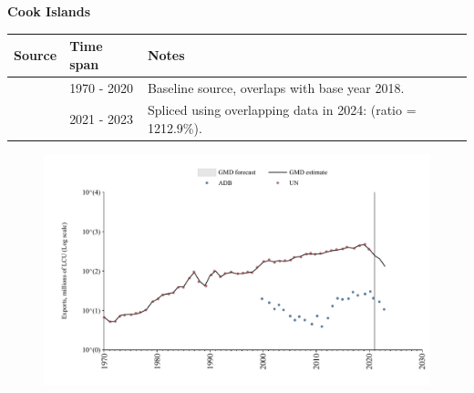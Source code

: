 \documentclass[12pt,a4paper,landscape]{article}
\begin{document}
\begin{adjustbox}{max totalsize={\paperwidth}{\paperheight},center}
\begin{minipage}[t][\textheight][t]{\textwidth}
\vspace*{0.5cm}
{}
\begin{center}
{\Large\bfseries Cook Islands}
\end{center}
\vspace{0.5cm}
\begin{table}[H]
\centering
\small
\begin{tabular}{|l|l|l|}
\hline
\textbf{Source} & \textbf{Time span} & \textbf{Notes} \\
\hline
\rowcolor{white}\cite{UN}& 1970 - 2020 &Baseline source, overlaps with base year 2018.\\
\rowcolor{lightgray}\cite{ADB}& 2021 - 2023 &Spliced using overlapping data in 2024: (ratio = 1212.9\%).\\
\hline
\end{tabular}
\end{table}
\begin{figure}[H]
\centering
\includegraphics[width=\textwidth,height=0.6\textheight,keepaspectratio]{graphs/COK_exports.pdf}
\end{figure}
\end{minipage}
\end{adjustbox}
\end{document}
